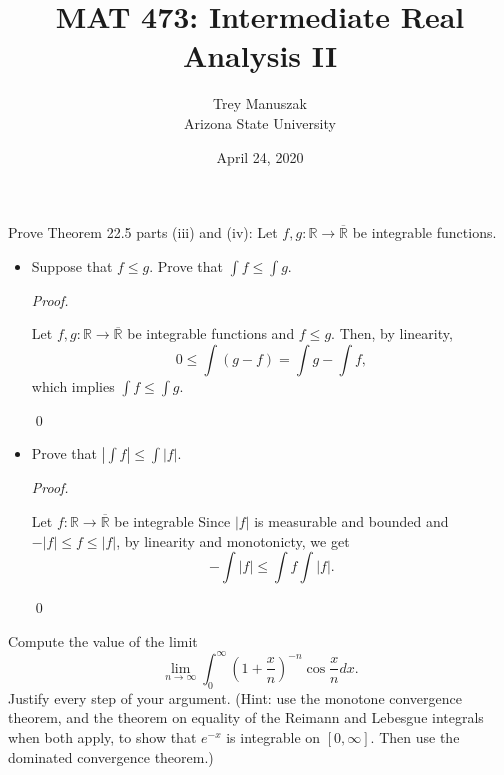 \documentclass[12pt]{article}
\title{MAT 473: Intermediate Real Analysis II}
\date{April 24, 2020}
\author{Trey Manuszak\\ Arizona State University}
\newenvironment{problem}[2][Problem]{\begin{trivlist}
\item[\hskip \labelsep {\bfseries #1}\hskip \labelsep {\bfseries
#2.}]}{\end{trivlist}}
\newenvironment{sol}
    {\emph{Proof.}
    }
    {
    \qed
    }
\begin{document}


\maketitle
\newpage


\begin{problem}{49}
Prove Theorem 22.5 parts (iii) and (iv): Let $f,g : \mathbb{R} \to \overline{\mathbb{R}}$ be integrable functions.
\begin{itemize}
  \item[(iii)] Suppose that $f \leq g$. Prove that $\int f \leq \int g$.
  
  \begin{sol}
    Let $f,g : \mathbb{R} \to \overline{\mathbb{R}}$ be integrable functions and $f \leq g$. Then, by linearity, $$0 \leq \int (g - f) = \int g - \int f,$$ which implies $\int f \leq \int g$.
  \end{sol}

  \item[(iv)] Prove that $\left| \int f \right| \leq \int | f |$. 
   
  \begin{sol}
    Let $f : \mathbb{R} \to \overline{\mathbb{R}}$ be integrable Since $\left| f \right|$ is measurable and bounded and $-\left|f \right| \leq f \leq \left| f \right|$, by linearity and monotonicty, we get $$- \int \left| f \right| \leq \int f \int \left| f \right|.$$
  \end{sol} 
\end{itemize}
\end{problem}

\begin{problem}{50}
Compute the value of the limit $$\lim_{n \to \infty} \int_{0}^{\infty}\left( 1 + \frac{x}{n} \right)^{-n}\cos \frac{x}{n}dx.$$ Justify every step of your argument. (Hint: use the monotone convergence theorem, and the theorem on equality of the Reimann and Lebesgue integrals when both apply, to show that $e^{-x}$ is integrable on $[0,\infty]$. Then use the dominated convergence theorem.)
\end{problem}
\end{document}
